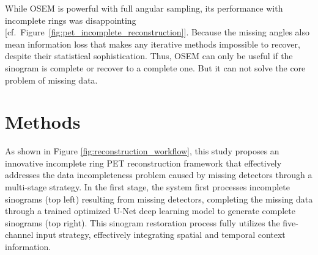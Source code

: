 \documentclass[12pt]{iopart}
\begin{document}
While OSEM is powerful with full angular sampling, its performance with incomplete rings was disappointing [cf.~Figure~\ref{fig:pet_incomplete_reconstruction}]. Because the missing angles also mean information loss that makes any iterative methods impossible to recover, despite their statistical sophistication. 
Thus, OSEM can only be useful if the sinogram is complete or recover to a complete one. But it can not solve the core problem of missing data.




\section{Methods}
\label{chap:methods}


As shown in Figure \ref{fig:reconstruction_workflow}, this study proposes an innovative incomplete ring PET reconstruction framework that effectively addresses the data incompleteness problem caused by missing detectors through a multi-stage strategy. In the first stage, the system first processes incomplete sinograms (top left) resulting from missing detectors, completing the missing data through a trained optimized U-Net deep learning model to generate complete sinograms (top right). This sinogram restoration process fully utilizes the five-channel input strategy, effectively integrating spatial and temporal context information.
\end{document}
